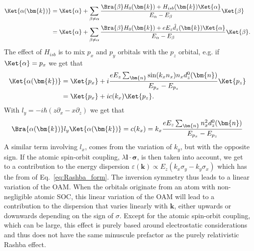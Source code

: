 \begin{align}
	\Ket{\alpha(\bm{k})}&=\Ket{\alpha} + \sum_{\beta \neq \alpha} \frac{\Bra{\beta} H_0(\bm{k}) + H_{isb}(\bm{k}) \Ket{\alpha}}{E_{\alpha} - E_{\beta}} \Ket{\beta}\\
	&=\Ket{\alpha} + \sum_{\beta \neq \alpha} \frac{\Bra{\beta} H_0(\bm{k}) + e E_z \hat{d}_z(\bm{k}) \Ket{\alpha}}{E_{\alpha} - E_{\beta}} \Ket{\beta}.
\end{align}
The effect of $H_{isb}$ is to mix $p_x$ and $p_y$ orbitals with the $p_z$ orbital, e.g. if $\Ket{\alpha} = p_x$ we get that
\begin{align}
	\Ket{\alpha(\bm{k})} &= \Ket{p_x} + i \frac{e E_z \sum_{\bm{n}} \sin(k_x n_x)n_x d_z^0(\bm{n})}{E_{p_x} - E_{p_z}} \Ket{p_z}\\
	&=\Ket{p_x} + i c(k_x) \Ket{p_z}.
\end{align}
With $l_y = -i\hbar(z \partial_x - x \partial_z )$ we get that
\begin{equation}
	\label{eq:oam_from_k}
	\Bra{\alpha(\bm{k})} l_y \Ket{\alpha(\bm{k})} = c(k_x) = k_x \frac{e E_z \sum_{\bm{n}} n_x^2d_z^0(\bm{n})}{E_{p_x} - E_{p_z}}
\end{equation}
A similar term involving $l_x$, comes from the variation of $k_y$, but with the opposite sign. If the atomic spin-orbit coupling, $\lambda \bm{l}\cdot\bm{\sigma}$, is then taken into account, we get to a contribution to the energy dispersion $\varepsilon(\bm{k}) \propto E_z (k_x \sigma_y - k_y \sigma_x)$ which has the from of Eq.~\ref{eq:Rashba_form}. 
The inversion symmetry thus leads to a linear variation of the OAM. When the orbitals originate from an atom with non-negligible atomic SOC, this linear variation of the OAM will lead to a contribution to the dispersion that varies linearly with $\bm{k}$, either upwards or downwards depending on the sign of $\sigma$. Except for the atomic spin-orbit coupling, which can be large, this effect is purely based around electrostatic considerations and thus does not have the same minuscule prefactor as the purely relativistic Rashba effect.

